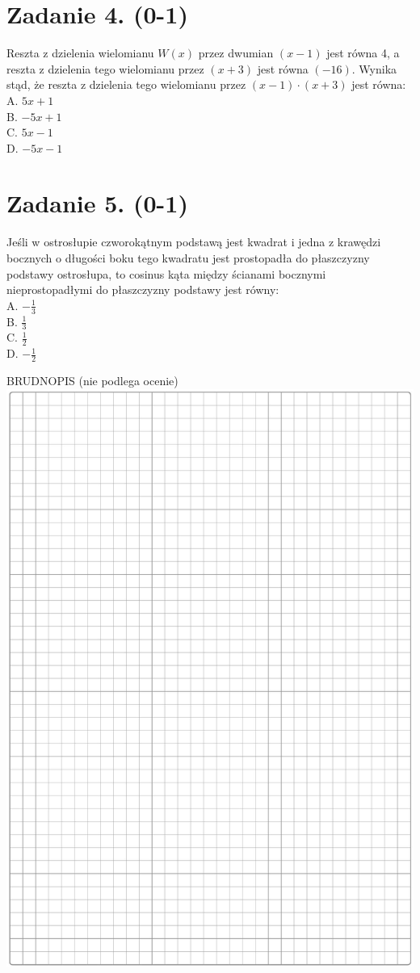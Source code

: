 \documentclass[10pt]{article}
\begin{document}
\section*{Zadanie 4. (0-1)}
Reszta z dzielenia wielomianu \(W(x)\) przez dwumian \((x-1)\) jest równa 4, a reszta z dzielenia tego wielomianu przez \((x+3)\) jest równa \((-16)\). Wynika stąd, że reszta z dzielenia tego wielomianu przez \((x-1) \cdot(x+3)\) jest równa:\\
A. \(5 x+1\)\\
B. \(-5 x+1\)\\
C. \(5 x-1\)\\
D. \(-5 x-1\)

\section*{Zadanie 5. (0-1)}
Jeśli w ostrosłupie czworokątnym podstawą jest kwadrat i jedna z krawędzi bocznych o długości boku tego kwadratu jest prostopadła do płaszczyzny podstawy ostrosłupa, to cosinus kąta między ścianami bocznymi nieprostopadłymi do płaszczyzny podstawy jest równy:\\
A. \(-\frac{1}{3}\)\\
B. \(\frac{1}{3}\)\\
C. \(\frac{1}{2}\)\\
D. \(-\frac{1}{2}\)

BRUDNOPIS (nie podlega ocenie)\\
\includegraphics[max width=\textwidth, center]{2024_11_21_06df787f12c5337a1fe8g-03}
\end{document}
